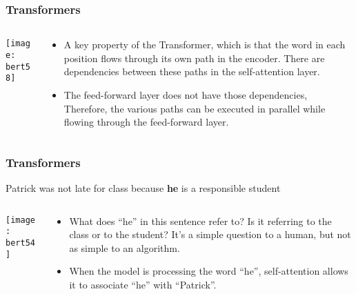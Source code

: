 \begin{frame}[fragile]\frametitle{Transformers}
\begin{columns}
    \begin{column}[T]{0.5\linewidth}
			\begin{center}
			\texttt{[image: bert58]}
			\end{center}		
		\end{column}
    \begin{column}[T]{0.5\linewidth}
      \begin{itemize}
			\item A key property of the Transformer, which is that the word in each position flows through its own path in the encoder. There are dependencies between these paths in the self-attention layer. 
			\item The feed-forward layer does not have those dependencies, Therefore, the various paths can be executed in parallel while flowing through the feed-forward layer.
			\end{itemize}
    \end{column}
  \end{columns}
			
\end{frame}

\begin{frame}[fragile]\frametitle{Transformers}
Patrick was not late for class because {\bf he} is a responsible student

\begin{columns}
    \begin{column}[T]{0.5\linewidth}
			\begin{center}
			\texttt{[image: bert54]}
			\end{center}		
		\end{column}
    \begin{column}[T]{0.5\linewidth}
      \begin{itemize}
			\item What does ``he'' in this sentence refer to? Is it referring to the class or to the student? It's a simple question to a human, but not as simple to an algorithm.
			\item When the model is processing the word ``he'', self-attention allows it to associate ``he'' with ``Patrick''.
			\end{itemize}
    \end{column}
  \end{columns}
			
\end{frame}

